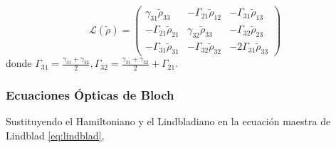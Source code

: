 \begin{equation}
    \mathcal{L}(\tilde{\rho}) = \begin{pmatrix} 
         \gamma_{31} \tilde{\rho}_{33} & -\Gamma_{21} \tilde{\rho}_{12} & -\Gamma_{31} \tilde{\rho}_{13} \\ 
        -\Gamma_{21} \tilde{\rho}_{21} & \gamma_{32} \tilde{\rho}_{33} & -\Gamma_{32} \tilde{\rho}_{23} \\ 
        -\Gamma_{31} \tilde{\rho}_{31} & -\Gamma_{32} \tilde{\rho}_{32} & - 2 \Gamma_{31} \tilde{\rho}_{33} \end{pmatrix}
    \label{eq:lindbladian}
\end{equation}
donde $\Gamma_{31} = \frac{\gamma_{31} + \gamma_{32}}{2}, \Gamma_{32} = \frac{\gamma_{31} + \gamma_{32}}{2} + \Gamma_{21}$.

\subsubsection*{Ecuaciones Ópticas de Bloch}
Sustituyendo el Hamiltoniano y el Lindbladiano en la ecuación maestra de Lindblad \ref{eq:lindblad}, 
